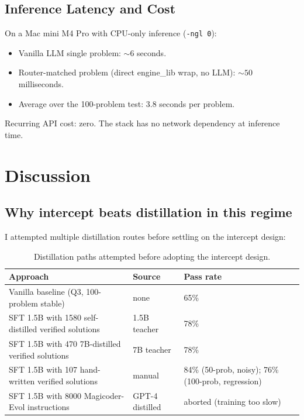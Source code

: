 \documentclass[11pt,a4paper]{article}
\begin{document}
\subsection{Inference Latency and Cost}

On a Mac mini M4 Pro with CPU-only inference (\texttt{-ngl 0}):

\begin{itemize}
\item Vanilla LLM single problem: $\sim 6$ seconds.
\item Router-matched problem (direct engine\_lib wrap, no LLM): $\sim 50$ milliseconds.
\item Average over the 100-problem test: 3.8 seconds per problem.
\end{itemize}

Recurring API cost: zero. The stack has no network dependency at inference time.

\section{Discussion}
\label{sec:discussion}

\subsection{Why intercept beats distillation in this regime}

I attempted multiple distillation routes before settling on the intercept design:

\begin{table}[h]
\centering
\caption{Distillation paths attempted before adopting the intercept design.}
\label{tab:distill}
\begin{tabular}{p{5.5cm}p{3cm}p{5cm}}
\toprule
Approach & Source & Pass rate \\
\midrule
Vanilla baseline (Q3, 100-problem stable) & none & 65\% \\
SFT 1.5B with 1580 self-distilled verified solutions & 1.5B teacher & 78\% \\
SFT 1.5B with 470 7B-distilled verified solutions & 7B teacher & 78\% \\
SFT 1.5B with 107 hand-written verified solutions & manual & 84\% (50-prob, noisy); 76\% (100-prob, regression) \\
SFT 1.5B with 8000 Magicoder-Evol instructions & GPT-4 distilled & aborted (training too slow) \\
\bottomrule
\end{tabular}
\end{table}
\end{document}
